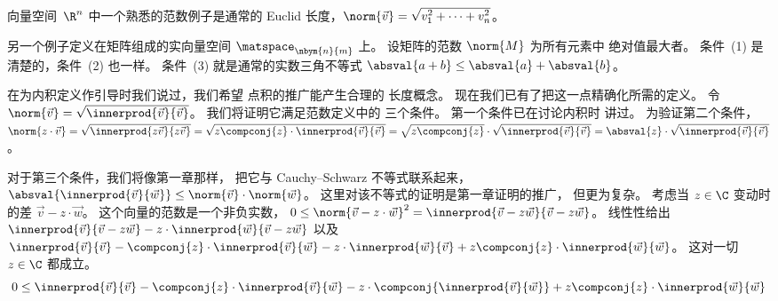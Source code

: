 向量空间~$\R^n$ 中一个熟悉的范数例子是通常的
Euclid 长度，$\norm{\vec{v}}=\sqrt{\smashdp{v_1^2+\cdots+v_n^2}}$。

另一个例子定义在矩阵组成的实向量空间
$\matspace_{\nbym{n}{m}}$ 上。
设矩阵的范数 $\norm{M}$ 为所有元素中
绝对值最大者。
条件~(1) 是清楚的，条件~(2) 也一样。
条件~(3) 就是通常的实数三角不等式
$\absval{a+b}\leq\absval{a}+\absval{b}$。


在为内积定义作引导时我们说过，我们希望
点积的推广能产生合理的
长度概念。
现在我们已有了把这一点精确化所需的定义。
令
$\norm{\vec{v}}=\sqrt{\smashdp{\innerprod{\vec{v}}{\vec{v}}}}$。
我们将证明它满足范数定义中的
三个条件。
第一个条件已在讨论内积时
讲过。
为验证第二个条件，
$\norm{z\cdot\vec{v}}
=\sqrt{\smashdp{\innerprod{z\vec{v}}{z\vec{v}}}}
=\sqrt{\smashdp{z\compconj{z}\cdot\innerprod{\vec{v}}{\vec{v}}}}
=\sqrt{z\compconj{z}}\cdot\sqrt{\smashdp{\innerprod{\vec{v}}{\vec{v}}}}
=\absval{z}\cdot\sqrt{\smashdp{\innerprod{\vec{v}}{\vec{v}}}}$。

对于第三个条件，我们将像第一章那样，
把它与 Cauchy–Schwarz 不等式联系起来，
$\absval{\innerprod{\vec{v}}{\vec{w}}}\leq \norm{\vec{v}}\cdot\norm{\vec{w}}$。
这里对该不等式的证明是第一章证明的推广，
但更为复杂。
考虑当 $z\in\C$ 变动时的差 $\vec{v}-z\cdot\vec{w}$。
这个向量的范数是一个非负实数，
$0\leq \norm{\vec{v}-z\cdot\vec{w}}^2
   =\innerprod{\vec{v}-z\vec{w}}{\vec{v}-z\vec{w}}$。
线性性给出
$\innerprod{\vec{v}}{\vec{v}-z\vec{w}}
  -z\cdot\innerprod{\vec{w}}{\vec{v}-z\vec{w}}$
以及
$\innerprod{\vec{v}}{\vec{v}}
  -\compconj{z}\cdot\innerprod{\vec{v}}{\vec{w}}
  -z\cdot\innerprod{\vec{w}}{\vec{v}}
  +z\compconj{z}\cdot\innerprod{\vec{w}}{\vec{w}}$。
这对一切 $z\in\C$ 都成立。
\begin{equation*}
 0
  \leq\innerprod{\vec{v}}{\vec{v}}
  -\compconj{z}\cdot\innerprod{\vec{v}}{\vec{w}}
  -z\cdot\compconj{\innerprod{\vec{v}}{\vec{w}}}
  +z\compconj{z}\cdot\innerprod{\vec{w}}{\vec{w}}
\end{equation*}

